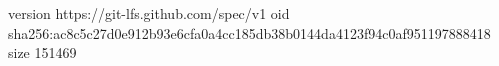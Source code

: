 version https://git-lfs.github.com/spec/v1
oid sha256:ac8c5c27d0e912b93e6cfa0a4cc185db38b0144da4123f94c0af951197888418
size 151469
